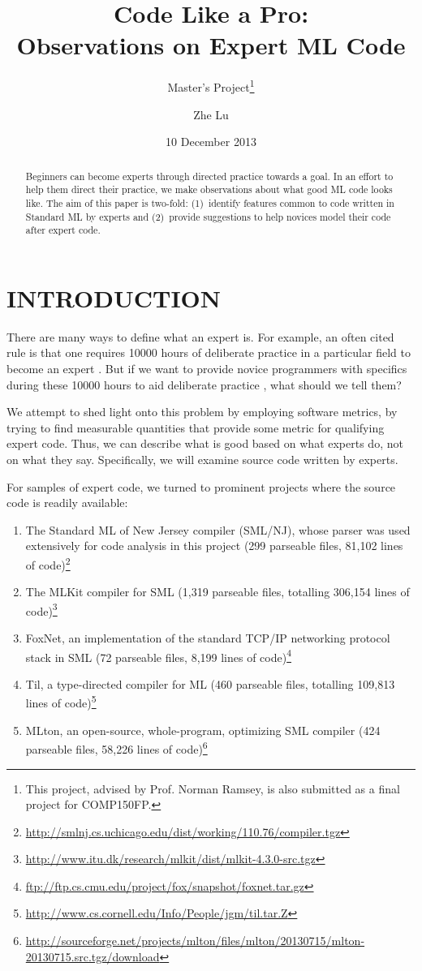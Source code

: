 \documentclass[12pt,abstracton]{scrartcl}
\title{Code Like a Pro:\\Observations on Expert ML Code}
\subtitle{Master's Project\footnote{This project, advised by Prof. Norman Ramsey, is also submitted as a final project for COMP150FP.}}
\author{Zhe Lu}
\date{10 December 2013}
\begin{document}


\maketitle
\begin{abstract}
Beginners can become experts through directed practice towards a goal. In an effort to
help them direct their practice, we make observations about what good ML code looks like.
The aim of this paper is two-fold: (1)~identify features common to code written in Standard ML by experts and
(2)~provide suggestions to help novices model their code after expert code.
\end{abstract}
\section{INTRODUCTION}
There are many ways to define what an expert is.
For example, an often cited rule is that one requires 10000 hours of deliberate practice
in a particular field to become an expert \cite{Gla08}. But if we want to provide novice programmers
with specifics during these 10000 hours to aid deliberate practice \cite{Eri93}, what should we tell them?

We attempt to shed light onto this problem by employing software metrics,
by trying to find measurable quantities
that provide some metric for qualifying expert code.
Thus, we can describe what is good based on what experts do, not on what they say.
Specifically, we will examine source code written by experts.

For samples of expert code, we turned to prominent projects where the source code is readily available:
\begin{enumerate}
\item The Standard ML of New Jersey compiler (SML/NJ), whose parser was used extensively for code analysis in this project (299 parseable files, 81,102 lines of code)\footnote{\url{http://smlnj.cs.uchicago.edu/dist/working/110.76/compiler.tgz}}
\item The MLKit compiler for SML (1,319 parseable files, totalling 306,154 lines of code)\footnote{\url{http://www.itu.dk/research/mlkit/dist/mlkit-4.3.0-src.tgz}}
\item FoxNet, an implementation of the standard TCP/IP networking protocol stack in SML (72 parseable files, 8,199 lines of code)\footnote{\url{ftp://ftp.cs.cmu.edu/project/fox/snapshot/foxnet.tar.gz}}
\item Til, a type-directed compiler for ML (460 parseable files, totalling 109,813 lines of code)\footnote{\url{http://www.cs.cornell.edu/Info/People/jgm/til.tar.Z}}
\item MLton, an open-source, whole-program, optimizing SML compiler (424 parseable files, 58,226 lines of code)\footnote{\url{http://sourceforge.net/projects/mlton/files/mlton/20130715/mlton-20130715.src.tgz/download}}
\end{enumerate}
\end{document}
